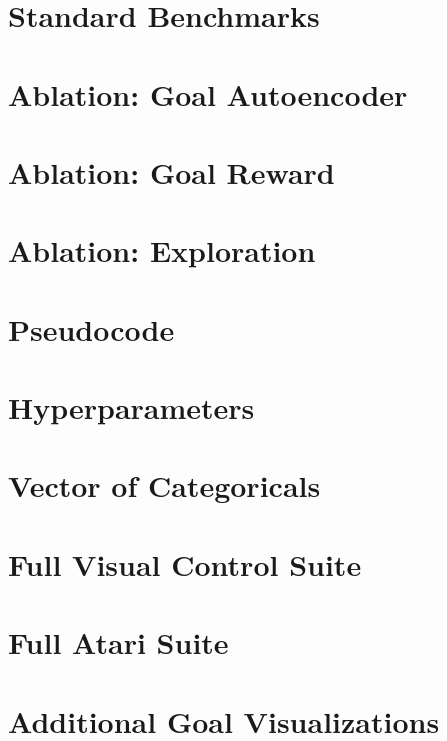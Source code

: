\clearpage
\section{Standard Benchmarks}
\label{sec:standardfig}


\section{Ablation: Goal Autoencoder}


\clearpage
\section{Ablation: Goal Reward}


\section{Ablation: Exploration}


\clearpage
\section{Pseudocode}
\label{sec:algo}


\section{Hyperparameters}
\label{sec:hparams}


\clearpage
\section{Vector of Categoricals}
\label{sec:veccat}




\clearpage


\clearpage
\section{Full Visual Control Suite}
\label{sec:dmc}


\clearpage
\section{Full Atari Suite}
\label{sec:atari}


\clearpage
\section{Additional Goal Visualizations}
\label{sec:moregoals}
